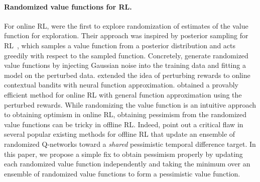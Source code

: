 \documentclass{article} \usepackage{iclr2023/iclr2023_conference,times}
\begin{document}
\paragraph{Randomized value functions for RL.} 
For online RL, \citet{osband2016generalization,osband2019deep} were the first to explore randomization of estimates of the value function for exploration. Their approach was inspired by posterior sampling for RL~\citep{osband2013more}, which samples a value function from a posterior distribution and acts greedily with respect to the sampled function. Concretely, \citet{osband2016generalization,osband2019deep} generate randomized value functions by injecting Gaussian noise into the training data and fitting a model on the perturbed data. \citet{jia2022learning} extended the idea of perturbing rewards to online contextual bandits with neural function approximation. \citet{ishfaq2021randomized} obtained a provably efficient method for online RL with general function approximation using the perturbed rewards. 
While randomizing the value function is an intuitive approach to obtaining optimism in online RL, obtaining pessimism from the randomized value functions can be tricky in offline RL. Indeed, \citet{ghasemipour2022so} point out a critical flaw in several popular existing methods for offline RL that update an ensemble of randomized Q-networks toward a \emph{shared} pessimistic temporal difference target. In this paper, we propose a simple fix to obtain pessimism properly by updating each randomized value function independently and taking the minimum over an ensemble of randomized value functions to form a pessimistic value function.
\end{document}
